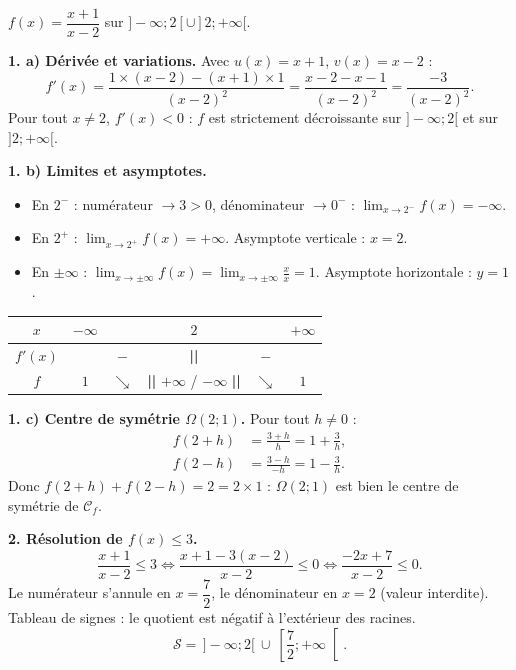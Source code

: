 \documentclass[11pt]{article}
\begin{document}
\begin{corrige}
$f(x)=\dfrac{x+1}{x-2}$ sur $]-\infty;2[\cup]2;+\infty[$.

\textbf{1. a) Dérivée et variations.} Avec $u(x)=x+1$, $v(x)=x-2$ :
\[ f'(x)=\frac{1\times(x-2)-(x+1)\times 1}{(x-2)^2}=\frac{x-2-x-1}{(x-2)^2}=\frac{-3}{(x-2)^2}. \]
Pour tout $x\neq 2$, $f'(x)<0$ : $f$ est strictement décroissante sur $]-\infty;2[$ et sur $]2;+\infty[$.

\textbf{1. b) Limites et asymptotes.}
\begin{itemize}
    \item En $2^-$ : numérateur $\to 3>0$, dénominateur $\to 0^-$ : $\displaystyle\lim_{x\to 2^-}f(x)=-\infty$.
    \item En $2^+$ : $\displaystyle\lim_{x\to 2^+}f(x)=+\infty$. \quad Asymptote verticale : $\boxed{x=2}$.
    \item En $\pm\infty$ : $\displaystyle\lim_{x\to\pm\infty}f(x)=\lim_{x\to\pm\infty}\frac{x}{x}=1$. \quad Asymptote horizontale : $\boxed{y=1}$.
\end{itemize}

\begin{center}
\begin{tabular}{|c|ccccc|}\hline
$x$ & $-\infty$ & & $2$ & & $+\infty$ \\ \hline
$f'(x)$ & & $-$ & \textbf{||} & $-$ & \\ \hline
$f$ & $1$ & $\searrow$ & \textbf{||} $+\infty$ / $-\infty$ \textbf{||} & $\searrow$ & $1$ \\ \hline
\end{tabular}
\end{center}

\textbf{1. c) Centre de symétrie $\Omega(2;1)$.} Pour tout $h\neq 0$ :
\begin{align*}
f(2+h)&=\frac{3+h}{h}=1+\frac{3}{h},\\
f(2-h)&=\frac{3-h}{-h}=1-\frac{3}{h}.
\end{align*}
Donc $f(2+h)+f(2-h)=2=2\times 1$ : $\Omega(2;1)$ est bien le centre de symétrie de $\mathcal{C}_f$.

\textbf{2. Résolution de $f(x)\le 3$.}
\[ \frac{x+1}{x-2}\le 3 \iff \frac{x+1-3(x-2)}{x-2}\le 0 \iff \frac{-2x+7}{x-2}\le 0. \]
Le numérateur s'annule en $x=\dfrac{7}{2}$, le dénominateur en $x=2$ (valeur interdite). Tableau de signes : le quotient est négatif à l'extérieur des racines.
\[ \mathcal{S}=\,]-\infty;2[\ \cup\ \left[\frac{7}{2};+\infty\right[. \]


\end{corrige}
\end{document}
